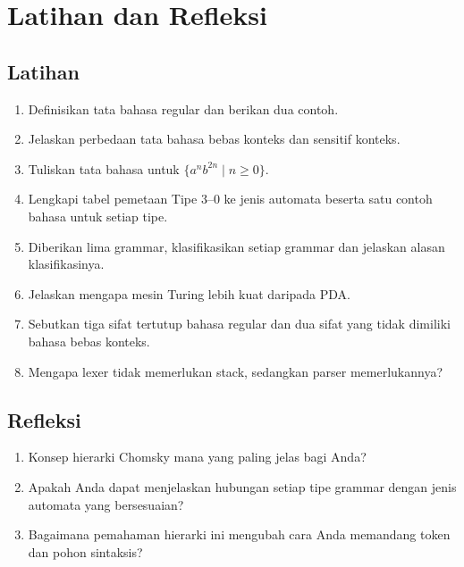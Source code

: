 \section*{Latihan dan Refleksi}

\subsection*{Latihan}
\begin{enumerate}[label=\arabic*.,leftmargin=*]
  \item Definisikan tata bahasa regular dan berikan dua contoh.
  \item Jelaskan perbedaan tata bahasa bebas konteks dan sensitif
        konteks.
  \item Tuliskan tata bahasa untuk \(\{a^n b^{2n} \mid n \ge 0\}\).
  \item Lengkapi tabel pemetaan Tipe 3--0 ke jenis automata beserta
        satu contoh bahasa untuk setiap tipe.
  \item Diberikan lima grammar, klasifikasikan setiap grammar dan
        jelaskan alasan klasifikasinya.
  \item Jelaskan mengapa mesin Turing lebih kuat daripada PDA.
  \item Sebutkan tiga sifat tertutup bahasa regular dan dua sifat
        yang tidak dimiliki bahasa bebas konteks.
  \item Mengapa lexer tidak memerlukan stack, sedangkan parser
        memerlukannya?
\end{enumerate}

\subsection*{Refleksi}
\begin{reflectionbox}
\begin{enumerate}[label=\arabic*.,leftmargin=*]
  \item Konsep hierarki Chomsky mana yang paling jelas bagi Anda?
  \item Apakah Anda dapat menjelaskan hubungan setiap tipe grammar
        dengan jenis automata yang bersesuaian?
  \item Bagaimana pemahaman hierarki ini mengubah cara Anda memandang
        token dan pohon sintaksis?
\end{enumerate}
\end{reflectionbox}
